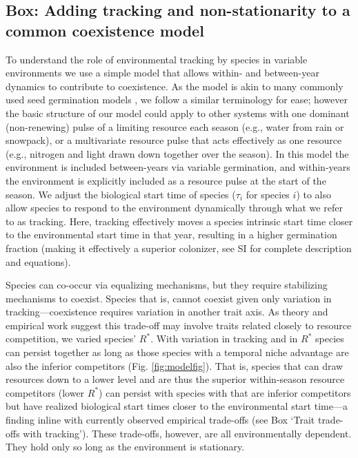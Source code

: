 \documentclass[11pt,letterpaper]{article}
\newcommand{\R}[1]{\label{}\linelabel{#1}} %
\begin{document}
\subsection{Box: Adding tracking and non-stationarity to a common coexistence model} %
To understand the role of environmental tracking by species in variable environments we use a simple model that allows within- and between-year dynamics to contribute to coexistence. As the model is akin to many commonly used seed germination models \citep{Chesson:2004eo}, we follow a similar terminology for ease; however the basic structure of our model could apply to other systems with one dominant (non-renewing) pulse of a limiting resource each season (e.g., water from rain or snowpack),\R{r2precip} or a multivariate resource pulse that acts effectively as one resource (e.g., nitrogen and light drawn down together over the season). In this model the environment is included between-years via variable germination, and within-years the environment is explicitly included as a resource pulse at the start of the season. We adjust the biological start time of species ($\tau_i$ for species $i$) to also allow species to respond to the environment dynamically through what we refer to as tracking. Here, tracking effectively moves a species intrinsic start time closer to the environmental start time in that year, resulting in a higher germination fraction (making it effectively a superior colonizer,\R{r2colon} see SI for complete description and equations).

Species can co-occur via equalizing mechanisms, but they require stabilizing mechanisms to coexist. Species that is, cannot coexist given only variation in tracking---coexistence requires variation in another trait axis. As theory and empirical work suggest this trade-off may involve traits related closely to resource competition, we varied species' $R^*$. With variation in tracking and in $R^*$ species can persist together as long as those species with a temporal niche advantage are also the inferior competitors (Fig. \ref{fig:modelfig}). That is, species that can draw resources down to a lower level and are thus the superior within-season resource competitors (lower $R^*$) can persist with species with that are inferior competitors but have realized biological start times closer to the environmental start time---a finding inline with currently observed empirical trade-offs (see Box `Trait trade-offs with tracking'). These trade-offs, however, are all environmentally dependent. They hold only so long as the environment is stationary. 
\end{document}
